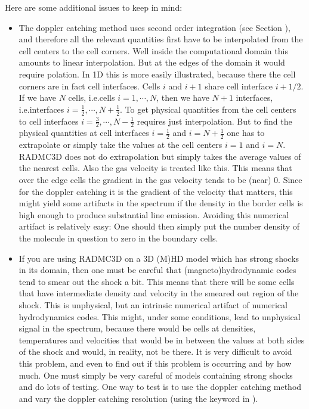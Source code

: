 \documentclass[letterpaper,10pt,english]{sphinxmanual}
\begin{document}
Here are some additional issues to keep in mind:
\begin{itemize}
\item {} 
The doppler catching method uses second order integration (see Section
{\hyperref[\detokenize{imagesspectra:sec-second-order}]{}}), and therefore all the relevant quantities first
have to be interpolated from the cell centers to the cell corners. Well
inside the computational domain this amounts to linear interpolation. But
at the edges of the domain it would require  polation.
In 1\sphinxhyphen{}D this is more easily illustrated, because
there the cell corners are in fact cell interfaces. Cells \(i\) and \(i+1\)
share cell interface \(i+1/2\). If we have \(N\) cells, i.e.cells
\(i=1,\cdots,N\), then we have \(N+1\) interfaces, i.e.interfaces
\(i=\tfrac{1}{2},\cdots,N+\tfrac{1}{2}\). To get physical quantities from
the cell centers to cell interfaces
\(i=\tfrac{3}{2},\cdots,N-\tfrac{1}{2}\) requires just interpolation. But
to find the physical quantities at cell interfaces \(i=\tfrac{1}{2}\) and
\(i=N+\tfrac{1}{2}\) one has to extrapolate or simply take the values at
the cell centers \(i=1\) and \(i=N\). RADMC\sphinxhyphen{}3D does not do
extrapolation but simply takes the average values of the nearest
cells. Also the gas velocity is treated like this. This means that over
the edge cells the gradient in the gas velocity tends to be (near)
0. Since for the doppler catching it is the gradient of the velocity that
matters, this might yield some artifacts in the spectrum if the density in
the border cells is high enough to produce substantial line
emission. Avoiding this numerical artifact is relatively easy: One should
then simply put the number density of the molecule in question to zero in
the boundary cells.

\item {} 
If you are using RADMC\sphinxhyphen{}3D on a 3\sphinxhyphen{}D (M)HD model which has strong shocks
in its domain, then one must be careful that (magneto\sphinxhyphen{})hydrodynamic codes
tend to smear out the shock a bit. This means that there will be some
cells that have intermediate density and velocity in the smeared out
region of the shock. This is unphysical, but an intrinsic numerical
artifact of numerical hydrodynamics codes. This might, under some
conditions, lead to unphysical signal in the spectrum, because there would
be cells at densities, temperatures and velocities that would be in
between the values at both sides of the shock and would, in reality, not
be there. It is very difficult to avoid this problem, and even to find out
if this problem is occurring and by how much. One must simply be very
careful of models containing strong shocks and do lots of testing.  One
way to test is to use the doppler catching method and vary the doppler
catching resolution (using the 
keyword in ).


\end{itemize}
\end{document}
